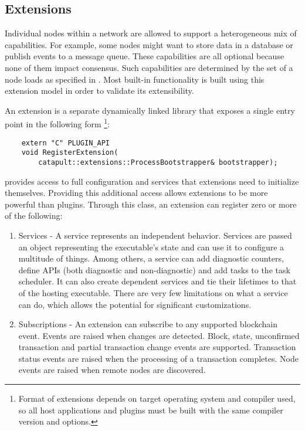 \subsection{\codenamespace Extensions}
\label{sec:system:extensions}

Individual nodes within a network are allowed to support a heterogeneous mix of capabilities.
For example, some nodes might want to store data in a database or publish events to a message queue.
These capabilities are all optional because none of them impact consensus.
Such capabilities are determined by the set of  a node loads as specified in .
Most built-in \codenamespace functionality is built using this extension model in order to validate its extensibility.

An extension is a separate dynamically linked library that exposes a single entry point in the following form
\footnote{Format of extensions depends on target operating system and compiler used, so all host applications and plugins must be built with the same compiler version and options.}:

\begin{lstlisting}
	extern "C" PLUGIN_API
	void RegisterExtension(
		catapult::extensions::ProcessBootstrapper& bootstrapper);
\end{lstlisting}

 provides access to full \codenamespace configuration and services that extensions need to initialize themselves.
Providing this additional access allows extensions to be more powerful than plugins.
Through this class, an extension can register zero or more of the following:

\begin{enumerate}
	\item{Services -
		A service represents an independent behavior.
		Services are passed an object representing the executable's state and can use it to configure a multitude of things.
		Among others, a service can add diagnostic counters, define APIs (both diagnostic and non-diagnostic) and add tasks to the task scheduler.
		It can also create dependent services and tie their lifetimes to that of the hosting executable.
		There are very few limitations on what a service can do, which allows the potential for significant customizations.
	}
	\item{Subscriptions -
		An extension can subscribe to any supported blockchain event.
		Events are raised when changes are detected.
		Block, state, unconfirmed transaction and partial transaction change events are supported.
		Transaction status events are raised when the processing of a transaction completes.
		Node events are raised when remote nodes are discovered.
	}
\end{enumerate}

